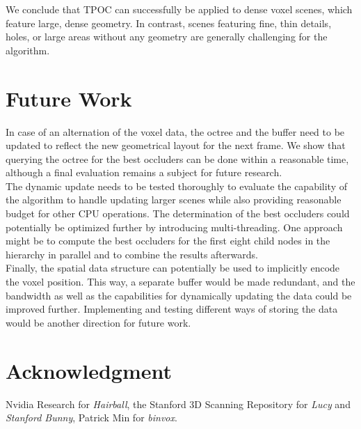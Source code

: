 \documentclass[conference]{IEEEtran}
\begin{document}
\noindent
We conclude that \ac{TPOC} can successfully be applied to dense voxel scenes, which feature large, dense 
geometry. In contrast, scenes featuring fine, thin details, holes, or large areas without any geometry are 
generally challenging for the algorithm.

\section{Future Work} \label{sec-future-work}

\noindent   %
In case of an alternation of the voxel data, the octree and the buffer need to be updated to reflect the 
new geometrical layout for the next frame. We show that querying the octree for the best occluders can be done 
within a reasonable time, although a final evaluation remains a subject for future research. \\

\noindent
The dynamic update needs to be tested thoroughly to evaluate the capability of the algorithm to handle updating 
larger scenes while also providing reasonable budget for other \ac{CPU} operations. The determination of the best 
occluders could potentially be optimized further by introducing multi-threading. One approach might be to 
compute the best occluders for the first eight child nodes in the hierarchy in parallel and to combine the results 
afterwards. \\




\noindent
Finally, the spatial data structure can potentially be used to implicitly encode the voxel position. This way, 
a separate buffer would be made redundant, and the bandwidth as well as the capabilities for dynamically updating 
the data could be improved further. Implementing and testing different ways of storing the data would be another 
direction for future work.

\section*{Acknowledgment} \label{section-acknowledgment}

\noindent
Nvidia Research for \emph{Hairball}, the Stanford 3D Scanning Repository for \emph{Lucy} 
and \emph{Stanford Bunny}, Patrick Min for \emph{binvox}.
\end{document}
